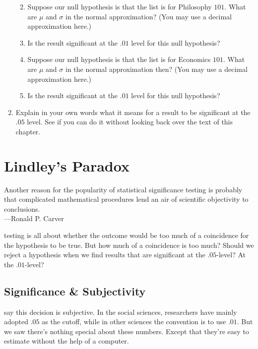 \documentclass[justified]{tufte-book}
\providecommand{\tightlist}{%
  \setlength{\itemsep}{0pt}\setlength{\parskip}{0pt}}
\newenvironment{epigraph}%
{
\begin{flushright}    
\begin{minipage}{20em}
\begin{flushright}
\itshape
}%
{
\end{flushright}
\end{minipage}
\end{flushright}
}
\theoremstyle{definition}
\theoremstyle{definition}
\theoremstyle{definition}
\theoremstyle{remark}
\begin{document}
\begin{enumerate}
  \begin{enumerate}
  \def\labelenumii{\alph{enumii}.}
  \tightlist
  \item
    Suppose our null hypothesis is that the list is for Philosophy
    \(101\). What are \(\mu\) and \(\sigma\) in the normal
    approximation? (You may use a decimal approximation here.)
  \item
    Is the result significant at the \(.01\) level for this null
    hypothesis?
  \item
    Suppose our null hypothesis is that the list is for Economics
    \(101\). What are \(\mu\) and \(\sigma\) in the normal approximation
    then? (You may use a decimal approximation here.)
  \item
    Is the result significant at the \(.01\) level for this null
    hypothesis?
  \end{enumerate}
\item
  Explain in your own words what it means for a result to be significant
  at the \(.05\) level. See if you can do it without looking back over
  the text of this chapter.
\end{enumerate}

\hypertarget{chlindley}{%
\chapter{Lindley's Paradox}\label{chlindley}}

\begin{epigraph}
Another reason for the popularity of statistical significance testing is
probably that complicated mathematical procedures lend an air of
scientific objectivity to conclusions.\\
---Ronald P. Carver
\end{epigraph}

 testing is all about whether the outcome would
be too much of a coincidence for the hypothesis to be true. But how much
of a coincidence is too much? Should we reject a hypothesis when we find
results that are significant at the \(.05\)-level? At the \(.01\)-level?

\hypertarget{significance-subjectivity}{%
\section{Significance \& Subjectivity}\label{significance-subjectivity}}

 say this decision is subjective. In the social
sciences, researchers have mainly adopted \(.05\) as the cutoff, while
in other sciences the convention is to use \(.01\). But we saw there's
nothing special about these numbers. Except that they're easy to
estimate without the help of a computer.
\end{document}
